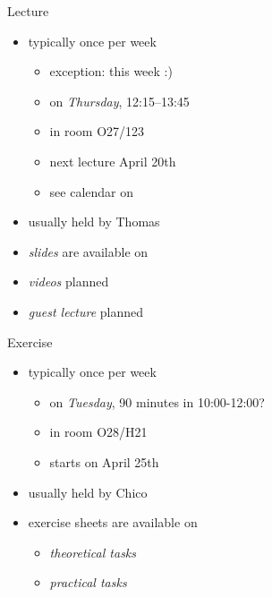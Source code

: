 \begin{frame}{\myframetitle}
	\begin{fancycolumns}
		\begin{definition}{Lecture}
			\begin{itemize}
				\item typically once per week
				\begin{itemize}
					\item exception: this week :)
					\item on \emph{Thursday}, 12:15--13:45
					\item in room O27/123
					\item next lecture April 20th
					\item see calendar on \ulmMoodle
				\end{itemize}
				\item usually held by Thomas
				\item \emph{slides} are available on \ulmMoodle
				\item \emph{videos} planned
				\item \emph{guest lecture} planned
			\end{itemize}
		\end{definition}
	\nextcolumn
		\begin{example}{Exercise}
			\begin{itemize}
				\item typically once per week
				\begin{itemize}
					\item on \emph{Tuesday}, 90 minutes in 10:00-12:00?
					\item in room O28/H21
					\item starts on April 25th
				\end{itemize}
				\item usually held by Chico
				\item exercise sheets are available on \ulmMoodle
				\begin{itemize}
					\item \emph{theoretical tasks}
					\item \emph{practical tasks}
				\end{itemize}
			\end{itemize}
		\end{example}
	\end{fancycolumns}
\end{frame}

